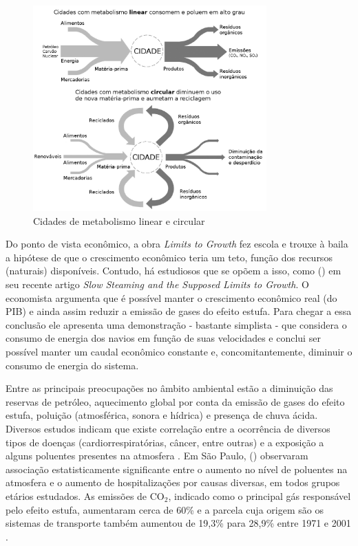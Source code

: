 \begin{figure}[htb]%
    \caption{\label{fig:cidade-metabolismos}Cidades de metabolismo linear e circular}%
    \begin{center}%
        \includegraphics[width=0.80\textwidth]{./imagens/richard-linear-circular.jpg}%
    \end{center}%
\end{figure}%

Do ponto de vista econômico, a obra \emph{Limits to Growth} fez escola e trouxe à baila a hipótese de que o crescimento econômico teria um teto, função dos recursos (naturais) disponíveis. Contudo, há estudiosos que se opõem a isso, como  (\citeyear{KRUGMAN2014}) em seu recente artigo \emph{Slow Steaming and the Supposed Limits to Growth}. O economista argumenta que é possível manter o crescimento econômico real (do PIB) e ainda assim reduzir a emissão de gases do efeito estufa. Para chegar a essa conclusão ele apresenta uma demonstração - bastante simplista - que considera o consumo de energia dos navios em função de suas velocidades e conclui ser possível manter um caudal econômico constante e, concomitantemente, diminuir o consumo de energia do sistema.

Entre as principais preocupações no âmbito ambiental estão a diminuição das reservas de petróleo, aquecimento global por conta da emissão de gases do efeito estufa, poluição (atmosférica, sonora e hídrica) e presença de chuva ácida. Diversos estudos indicam que existe correlação entre a ocorrência de diversos tipos de doenças (cardiorrespiratórias, câncer, entre outras) e a exposição a alguns poluentes presentes na atmosfera \cite{WHO2000,WHO2006,BRUNEKREEF2012,MIRANDA2012}. Em São Paulo,  (\citeyear{GOUVEIA2006}) observaram associação estatisticamente significante entre o aumento no nível de poluentes na atmosfera e o aumento de hospitalizações por causas diversas, em todos grupos etários estudados. As emissões de CO$_2$, indicado como o principal gás responsável pelo efeito estufa, aumentaram cerca de 60\% e a parcela cuja origem são os sistemas de transporte também aumentou de 19,3\% para 28,9\% entre 1971 e 2001 \cite{BANISTER2005}.

